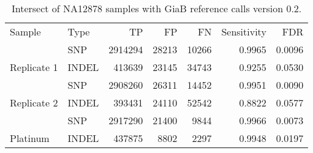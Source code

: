 \begin{table}[h]
\centering
\begin{tabular}{l|lrrrrr}
\rowcolor[HTML]{333333} 
{\color[HTML]{FFFFFF} Sample} & {\color[HTML]{FFFFFF} Type} & {\color[HTML]{FFFFFF} TP} & {\color[HTML]{FFFFFF} FP} & {\color[HTML]{FFFFFF} FN} & {\color[HTML]{FFFFFF} Sensitivity} & {\color[HTML]{FFFFFF} FDR} \\
 & \cellcolor[HTML]{C0C0C0}SNP & \cellcolor[HTML]{C0C0C0}2914294 & \cellcolor[HTML]{C0C0C0}28213 & \cellcolor[HTML]{C0C0C0}10266 & \cellcolor[HTML]{C0C0C0}0.9965 & \cellcolor[HTML]{C0C0C0}0.0096 \\
\multirow{-2}{*}{Replicate 1} & INDEL & 413639 & 23145 & 34743 & 0.9255 & 0.0530 \\
 & \cellcolor[HTML]{C0C0C0}SNP & \cellcolor[HTML]{C0C0C0}2908260 & \cellcolor[HTML]{C0C0C0}26311 & \cellcolor[HTML]{C0C0C0}14452 & \cellcolor[HTML]{C0C0C0}0.9951 & \cellcolor[HTML]{C0C0C0}0.0090 \\
\multirow{-2}{*}{Replicate 2} & INDEL & 393431 & 24110 & 52542 & 0.8822 & 0.0577 \\
 & \cellcolor[HTML]{C0C0C0}SNP & \cellcolor[HTML]{C0C0C0}2917290 & \cellcolor[HTML]{C0C0C0}21400 & \cellcolor[HTML]{C0C0C0}9844 & \cellcolor[HTML]{C0C0C0}0.9966 & \cellcolor[HTML]{C0C0C0}0.0073 \\
\multirow{-2}{*}{Platinum} & INDEL & 437875 & 8802 & 2297 & 0.9948 & 0.0197
\end{tabular}
\caption{Intersect of NA12878 samples with GiaB reference calls version 0.2.}
\label{table:FDRhigh}
\end{table}